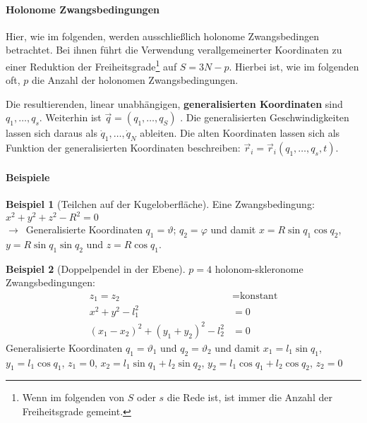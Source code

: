 \documentclass[oneside]{book}
\theoremstyle{definition}
\newtheorem*{beispiel*}{Beispiel}
\newcommand{\conseq}{$\rightarrow$~}
\newcommand{\dotvec}[1]{\dot{\vec{#1}}}
\begin{document}
\paragraph{Holonome Zwangsbedingungen}
Hier, wie im folgenden, werden ausschließlich holonome Zwangsbedingen betrachtet. Bei ihnen führt die Verwendung verallgemeinerter Koordinaten zu einer Reduktion der Freiheitsgrade\footnote{Wenn im folgenden von $S$ oder $s$ die Rede ist, ist immer die Anzahl der Freiheitsgrade gemeint.} auf $S = 3N - p$. Hierbei ist, wie im folgenden oft, $p$ die Anzahl der holonomen Zwangsbedingungen. 

Die resultierenden, linear unabhängigen, \textbf{generalisierten Koordinaten} sind $q_1, \dots, q_s$. Weiterhin ist $\vec{q} = (q_1, \dots, q_S)$
. Die generalisierten Geschwindigkeiten lassen sich daraus als $\dot{q}_1, \dots, \dot{q}_N$ ableiten. Die alten Koordinaten lassen sich als Funktion der generalisierten Koordinaten beschreiben: $\vec{r}_i = \vec{r}_i(q_1, \dots, q_s, t)$.

%
\paragraph{Beispiele}

\begin{beispiel*}[Teilchen auf der Kugeloberfläche]
	Eine Zwangsbedingung: $x^2 + y^2 + z^2 - R^2 = 0$\\
	\conseq Generalisierte Koordinaten $q_1 = \vartheta$; $q_2 = \varphi$ und damit $x = R \sin{q_1} \cos{q_2}$, $y = R \sin q_1 \sin q_2$ und $z = R \cos q_1$.
\end{beispiel*}

\begin{beispiel*}[Doppelpendel in der Ebene] $p = 4$ holonom-skleronome Zwangsbedingungen:
	\begin{align*}
	z_1 = z_2 &= \text{konstant}\\
	x^2 + y^2 - l^2_1 &= 0\\
	(x_1 - x_2)^2 + (y_1 + y_2)^2 - l_2^2 &= 0 
	\end{align*}
	Generalisierte Koordinaten $q_1 = \vartheta_1$ und $q_2 = \vartheta_2$ und damit $x_1 = l_1 \sin q_1$, $y_1 = l_1 \cos q_1$, $z_1 = 0$, $x_2 = l_1 \sin q_1 + l_2 \sin q_2$, $y_2 = l_1 \cos q_1 + l_2 \cos q_2$, $z_2 = 0$
\end{beispiel*}
\end{document}
